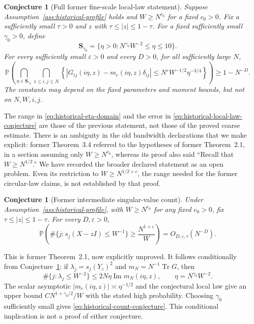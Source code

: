 \documentclass[11pt,reqno]{amsart}
\numberwithin{equation}{section}
\theoremstyle{plain}
\newtheorem{conjecture}[theorem]{Conjecture}
\theoremstyle{definition}
\theoremstyle{remark}
\begin{document}
\begin{conjecture}[Full former fine-scale local-law statement]
\label{conj:historical-local-law}
Suppose Assumption~\ref{ass:historical-profile} holds and
\(W\geq N^{c_0}\) for a fixed \(c_0>0\).  Fix a sufficiently small
\(\tau>0\) and \(z\) with \(\tau\leq|z|\leq1-\tau\).
For a fixed sufficiently small \(\gamma_0>0\), define
\begin{equation}
 \mathbf S_{\gamma_0}
 =\{\eta>0:N^{\gamma_0}W^{-2}\leq\eta\leq10\}.
 \label{eq:historical-eta-domain}
\end{equation}
For every sufficiently small \(\varepsilon>0\) and every \(D>0\),
for all sufficiently large \(N\),
\begin{equation}
 \mathbb P\left(
  \bigcap_{\eta\in\mathbf S_{\gamma_0}}
  \bigcap_{1\leq i,j\leq N}
  \left\{
   |G_{ij}(i\eta,z)-m_c(i\eta,z)\delta_{ij}|
   \leq N^\varepsilon W^{-1/2}\eta^{-3/4}
  \right\}
 \right)\geq1-N^{-D}.
 \label{eq:historical-local-law-conjecture}
\end{equation}
The constants may depend on the fixed parameters and moment bounds,
but not on \(N,W,i,j\).
\end{conjecture}

The range in \eqref{eq:historical-eta-domain} and the error in
\eqref{eq:historical-local-law-conjecture} are those of the previous
statement, not those of the proved coarse estimate.  There is an
ambiguity in the old bandwidth declarations that we make explicit:
former Theorem~3.4 referred to the hypotheses of former Theorem~2.1,
in a section assuming only \(W\geq N^{c_0}\), whereas its proof also
said ``Recall that \(W\geq N^{1/2}\).''  We have recorded the broader
declared statement as an open problem.  Even its restriction to
\(W\geq N^{1/2+c}\), the range needed for the former circular-law
claims, is not established by that proof.

\begin{conjecture}[Former intermediate singular-value count]
\label{conj:historical-count}
Under Assumption~\ref{ass:historical-profile}, with
\(W\geq N^{c_0}\) for any fixed \(c_0>0\), fix
\(\tau\leq|z|\leq1-\tau\).  For every \(D,\varepsilon>0\),
\begin{equation}
 \mathbb P\left(
  \#\{j:s_j(X-zI)\leq W^{-1}\}
  \geq \frac{N^{1+\varepsilon}}W
 \right)=O_{D,\varepsilon,\tau}(N^{-D}).
 \label{eq:historical-count-conjecture}
\end{equation}
\end{conjecture}

This is former Theorem~2.1, now explicitly unproved.  It follows
conditionally from Conjecture~\ref{conj:historical-local-law}:
if \(\lambda_j=s_j(Y_z)^2\) and
\(m_N=N^{-1}\operatorname{Tr}G\), then
\[
 \#\{j:\lambda_j\leq W^{-2}\}
 \leq2N\eta\operatorname{Im}m_N(i\eta,z),
 \qquad \eta=N^{\gamma_0}W^{-2}.
\]
The scalar asymptotic \(|m_c(i\eta,z)|\asymp\eta^{-1/2}\)
and the conjectural local law give an upper bound
\(C N^{1+\gamma_0/2}/W\) with the stated high probability.
Choosing \(\gamma_0\) sufficiently small gives
\eqref{eq:historical-count-conjecture}.  This conditional implication
is not a proof of either conjecture.
\end{document}
